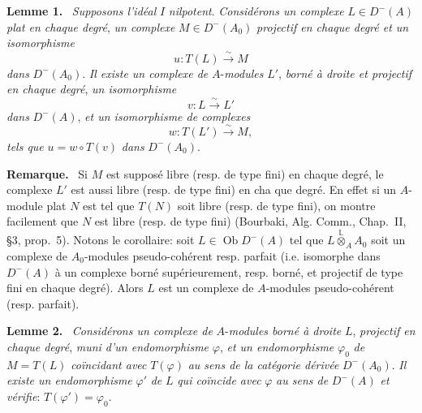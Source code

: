 \documentclass[11pt]{article}
\newenvironment{statement}[1]{\par\medskip\noindent\textbf{#1.}\ }{\par\medskip}
\begin{document}
\begin{statement}{Lemme 1}
\emph{Supposons l'idéal} $I$ \emph{nilpotent}. \emph{Considérons un complexe} $L\in D^-(A)$ \emph{plat en chaque degré}, \emph{un complexe} $M\in D^-(A_0)$ \emph{projectif en chaque degré et un isomorphisme}
\[
u:T(L)\xrightarrow{\sim}M
\]
\emph{dans} $D^-(A_0)$. \emph{Il existe un complexe de} $A$-\emph{modules} $L'$, \emph{borné à droite et projectif en chaque degré}, \emph{un isomorphisme}
\[
v:L\xrightarrow{\sim}L'
\]
\emph{dans} $D^-(A)$, \emph{et un isomorphisme de complexes}
\[
w:T(L')\xrightarrow{\sim}M,
\]
\emph{tels que} $u=w\circ T(v)$ \emph{dans} $D^-(A_0)$.
\end{statement}

\begin{statement}{Remarque}
Si $M$ est supposé libre (resp. de type fini) en chaque degré, le complexe $L'$ est aussi libre (resp. de type fini) en cha%
que
degré. En effet si un $A$-module plat $N$ est tel que $T(N)$ soit libre (resp. de type fini), on montre facilement que $N$ est libre (resp. de type fini) (Bourbaki, Alg. Comm., Chap.~II, §3, prop.~5). Notons le corollaire: soit $L\in\operatorname{Ob} D^-(A)$ tel que $L\overset{\mathbb L}{\otimes}_A A_0$ soit un complexe de $A_0$-modules pseudo-cohérent resp. parfait (i.e. isomorphe dans $D^-(A)$ à un complexe borné supérieurement, resp. borné, et projectif de type fini en chaque degré). Alors $L$ est un complexe de $A$-modules pseudo-cohérent (resp. parfait).
\end{statement}

\begin{statement}{Lemme 2}
\emph{Considérons un complexe de} $A$-\emph{modules borné à droite} $L$, \emph{projectif en chaque degré}, \emph{muni d'un endomorphisme} $\varphi$, \emph{et un endomorphisme} $\varphi_0$ \emph{de} $M=T(L)$ \emph{coïncidant avec} $T(\varphi)$ \emph{au sens de la catégorie dérivée} $D^-(A_0)$. \emph{Il existe un endomorphisme} $\varphi'$ \emph{de} $L$ \emph{qui coïncide avec} $\varphi$ \emph{au sens de} $D^-(A)$ \emph{et vérifie}: $T(\varphi')=\varphi_0$.
\end{statement}
\end{document}
